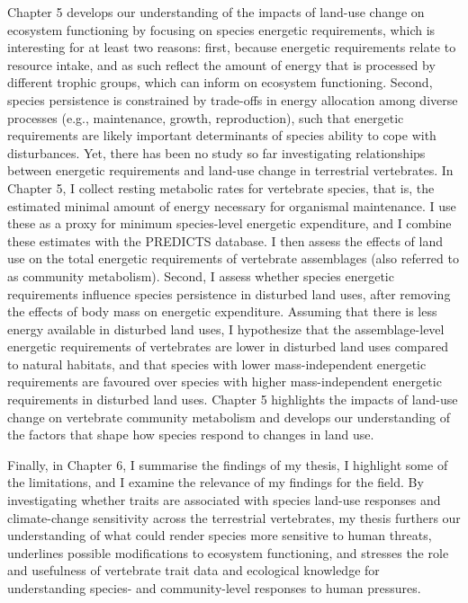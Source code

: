 Chapter 5 develops our understanding of the impacts of land-use change on ecosystem functioning by focusing on species energetic requirements, which is interesting for at least two reasons: first, because energetic requirements relate to resource intake, and as such reflect the amount of energy that is processed by different trophic groups, which can inform on ecosystem functioning. Second, species persistence is constrained by trade-offs in energy allocation among diverse processes (e.g., maintenance, growth, reproduction), such that energetic requirements are likely important determinants of species ability to cope with disturbances. Yet, there has been no study so far investigating relationships between energetic requirements and land-use change in terrestrial vertebrates. In Chapter 5, I collect resting metabolic rates for vertebrate species, that is, the estimated minimal amount of energy necessary for organismal maintenance. I use these as a proxy for minimum species-level energetic expenditure, and I combine these estimates with the PREDICTS database. I then assess the effects of land use on the total energetic requirements of vertebrate assemblages (also referred to as community metabolism). Second, I assess whether species energetic requirements influence species persistence in disturbed land uses, after removing the effects of body mass on energetic expenditure. Assuming that there is less energy available in disturbed land uses, I hypothesize that the assemblage-level energetic requirements of vertebrates are lower in disturbed land uses compared to natural habitats, and that species with lower mass-independent energetic requirements are favoured over species with higher mass-independent energetic requirements in disturbed land uses. Chapter 5 highlights the impacts of land-use change on vertebrate community metabolism and develops our understanding of the factors that shape how species respond to changes in land use.

Finally, in Chapter 6, I summarise the findings of my thesis, I highlight some of the limitations, and I examine the relevance of my findings for the field. By investigating whether traits are associated with species land-use responses and climate-change sensitivity across the terrestrial vertebrates, my thesis furthers our understanding of what could render species more sensitive to human threats, underlines possible modifications to ecosystem functioning, and stresses the role and usefulness of vertebrate trait data and ecological knowledge for understanding species- and community-level responses to human pressures.


